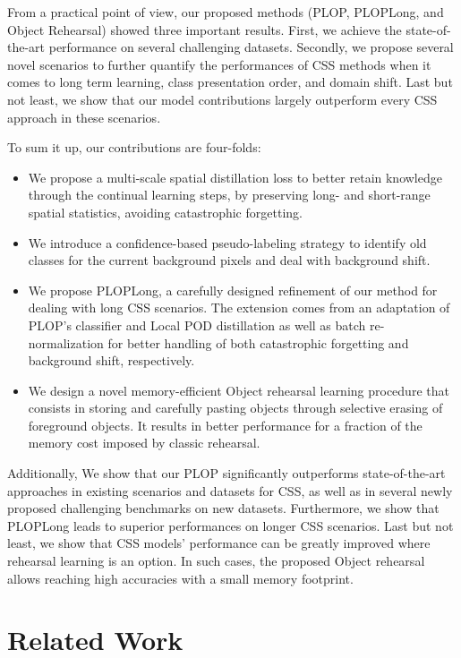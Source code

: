 From a practical point of view, our proposed methods (PLOP, PLOPLong, and Object Rehearsal) showed
three important results. First, we achieve the state-of-the-art performance on several challenging
datasets. Secondly, we propose several novel scenarios to further quantify the performances of
\ac{CSS} methods when it comes to long term learning, class presentation order, and domain shift.
Last but not least, we show that our model contributions largely outperform every \ac{CSS} approach
in these scenarios.

To sum it up, our contributions are four-folds:
\begin{itemize}
    \item We propose a multi-scale spatial distillation loss to better retain knowledge through the
          continual learning steps, by preserving long- and short-range spatial statistics, avoiding
          catastrophic forgetting.
    \item We introduce a confidence-based pseudo-labeling strategy to identify old classes for the
          current background pixels and deal with background shift.
    \item We propose PLOPLong, a carefully designed refinement of our method for dealing with long
          \ac{CSS} scenarios. The extension comes from an adaptation of PLOP's classifier and Local
          POD distillation as well as batch re-normalization for better handling of both
          catastrophic forgetting and background shift, respectively.
    \item We design a novel memory-efficient Object rehearsal learning procedure that consists in
          storing and carefully pasting objects through selective erasing of foreground objects. It
          results in better performance for a fraction of the memory cost imposed by classic
          rehearsal.
\end{itemize}

Additionally, We show that our PLOP significantly outperforms state-of-the-art approaches in
existing scenarios and datasets for \ac{CSS}, as well as in several newly proposed challenging
benchmarks on new datasets. Furthermore, we show that PLOPLong leads to superior performances on
longer \ac{CSS} scenarios. Last but not least, we show that \ac{CSS} models' performance can be
greatly improved where rehearsal learning is an option. In such cases, the proposed Object rehearsal
allows reaching high accuracies with a small memory footprint.

\section{Related Work}
\label{sec:seg_related}


